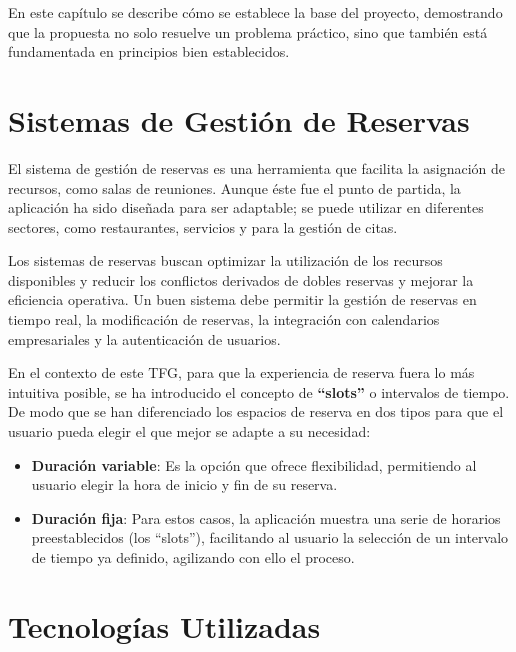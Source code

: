 
En este capítulo se describe cómo se establece la base del proyecto, demostrando que la propuesta no solo resuelve un problema práctico, sino que también está fundamentada en principios bien establecidos.

\section{Sistemas de Gestión de Reservas}

El sistema de gestión de reservas es una herramienta que facilita la asignación de recursos, como salas de reuniones. Aunque éste fue el punto de partida, la aplicación ha sido diseñada para ser adaptable; se puede utilizar en diferentes sectores, como restaurantes, servicios y para la gestión de citas.

Los sistemas de reservas buscan optimizar la utilización de los recursos disponibles y reducir los conflictos derivados de dobles reservas y mejorar la eficiencia operativa. Un buen sistema debe permitir la gestión de reservas en tiempo real, la modificación de reservas, la integración con calendarios empresariales y la autenticación de usuarios.

En el contexto de este TFG, para que la experiencia de reserva fuera lo más intuitiva posible, se ha introducido el concepto de \textbf{``slots''} o intervalos de tiempo. De modo que se han diferenciado los espacios de reserva en dos tipos para que el usuario pueda elegir el que mejor se adapte a su necesidad:
\begin{itemize}
\tightlist
   \item \textbf{Duración variable}: Es la opción que ofrece flexibilidad, permitiendo al usuario elegir la hora de inicio y fin de su reserva.
   \item \textbf{Duración fija}: Para estos casos, la aplicación muestra una serie de horarios preestablecidos (los ``slots''), facilitando al usuario la selección de un intervalo de tiempo ya definido, agilizando con ello el proceso.
\end{itemize}

\section{Tecnologías Utilizadas}

